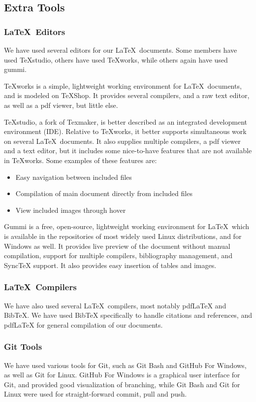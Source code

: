 \subsection{Extra Tools}
\subsubsection{\LaTeX \ Editors}
We have used several editors for our \LaTeX \ documents. Some members have used TeXstudio, others have used TeXworks, while others again have used gummi.

TeXworks is a simple, lightweight working environment for \LaTeX \ documents, and is modeled on TeXShop. It provides several compilers, and a raw text editor, as well as a pdf viewer, but little else.

TeXstudio, a fork of Texmaker, is better described as an integrated development environment (IDE). Relative to TeXworks, it better supports simultaneous work on several \LaTeX \ documents. It also supplies multiple compilers, a pdf viewer and a text editor, but it includes some nice-to-have features that are not available in TeXworks. Some examples of these features are:
\begin{itemize}
\item Easy navigation between included files
\item Compilation of main document directly from included files
\item View included images through hover
\end{itemize}

Gummi is a free, open-source, lightweight working environment for \LaTeX \ which is available in the repositories of most widely used Linux distributions, and for Windows as well. It provides live preview of the document without manual compilation, support for multiple compilers, bibliography management, and SyncTeX support. It also provides easy insertion of tables and images.

\subsubsection{\LaTeX \ Compilers}
We have also used several \LaTeX \ compilers, most notably pdfLaTeX and BibTeX. We have used BibTeX specifically to handle citations and references, and pdfLaTeX for general compilation of our documents.

\subsubsection{Git Tools}
We have used various tools for Git, such as Git Bash and GitHub For Windows, as well as Git for Linux. GitHub For Windows is a graphical user interface for Git, and provided good visualization of branching, while Git Bash and Git for Linux were used for straight-forward commit, pull and push.


